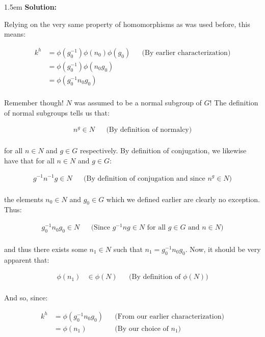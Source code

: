 \documentclass{article}
\newenvironment{solution}{
	\vspace{.5em}
	\par
	\begin{adjustwidth}{1.5em}{}
	\textbf{{Solution:}}
	\par
	\vspace{.5em}
}{
	\vspace{1em}
	\end{adjustwidth}
	\setcounter{step}{0}
	\newpage
}
\newcounter{step}
\begin{document}
\begin{solution}
	Relying on the very same property of homomorphisms as was used before, this means:

	\begin{align*}
		k^{h} &= \phi(g_{0}^{-1})\phi(n_{0})\phi(g_{0}) &&\text{(By earlier characterization)} \\
		&= \phi(g_{0}^{-1})\phi(n_{0}g_{0}) \\
		&= \phi(g_{0}^{-1}n_{0}g_{0}) \\
	\end{align*}

	Remember though! $N$ was assumed to be a normal subgroup of $G$! The definition of normal subgroups tells us that:

	\begin{align*}
		n^{g} \in N &&\text{(By definition of normalcy)} \\
	\end{align*}

	for all $n \in N$ and $g \in G$ respectively. By definition of conjugation, we likewise have that for all $n \in N$ and $g \in G$:
	
	\begin{align*}
		g^{-1}n^{-1}g \in N &&\text{(By definition of conjugation and since $n^{g} \in N$)} \\
	\end{align*}

	the elements $n_{0} \in N$ and $g_{0} \in G$ which we defined earlier are clearly no exception. Thus:

	\begin{align*}
		g^{-1}_{0}n_{0}g_{0} \in N &&\text{(Since $g^{-1}ng \in N$ for all $g \in G$ and $n \in N$)} \\
	\end{align*}

	and thus there exists some $n_{1} \in N$ such that $n_{1} = g^{-1}_{0}n_{0}g_{0}$. Now, it should be very apparent that:

	\begin{align*}
		\phi(n_{1}) &\in \phi(N) &&\text{(By definition of $\phi(N)$)} \\
	\end{align*}

	And so, since:

	\begin{align*}
		k^{h} &= \phi(g^{-1}_{0}n_{0}g_{0}) &&\text{(From our earlier characterization)} \\
		&= \phi(n_{1}) &&\text{(By our choice of $n_{1}$)} \\
	\end{align*}


\end{solution}
\end{document}

